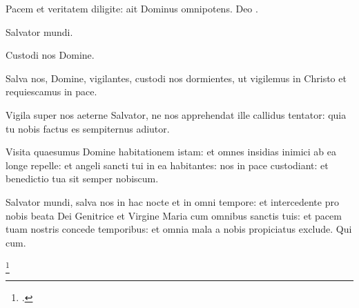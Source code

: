 

Pacem et veritatem diligite: ait Dominus omnipotens.
Deo .

 Salvator mundi.

 Custodi nos Domine.

Salva nos, Domine, vigilantes,
custodi nos dormientes,
ut vigilemus in Christo
et requiescamus in pace.\missingref{}


Vigila super nos aeterne Salvator,
ne nos apprehendat ille callidus tentator:
quia tu nobis factus es sempiternus adiutor.

Visita quaesumus Domine habitationem istam:
et omnes insidias inimici ab ea longe repelle:
et angeli sancti tui in ea habitantes:
nos in pace custodiant:
et benedictio tua sit semper nobiscum.

Salvator mundi, salva nos in hac nocte et in omni tempore:
et intercedente pro nobis beata Dei Genitrice et Virgine Maria
cum omnibus sanctis tuis:
et pacem tuam nostris concede temporibus:
et omnia mala a nobis propiciatus exclude.
Qui cum.

\footcite[121r]{bp1502}

